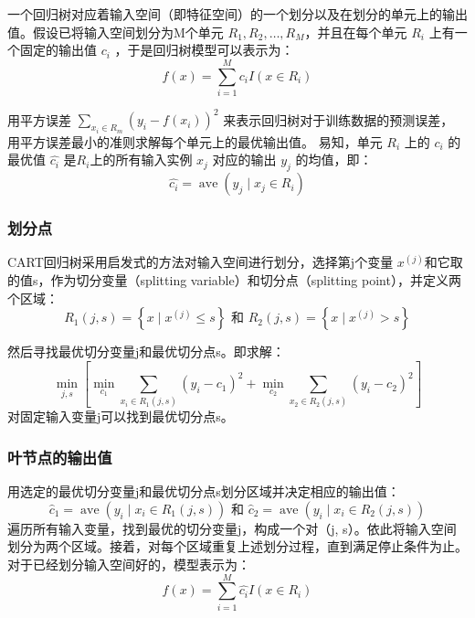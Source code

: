 \documentclass[UTF8,a4paper,AutoFakeBold,AutoFakeSlant]{article}
\begin{document}
一个回归树对应着输入空间（即特征空间）的一个划分以及在划分的单元上的输出值。假设已将输入空间划分为M个单元 
$ R_1, R_2,\dots, R_M $，并且在每个单元 $R_i$ 上有一个固定的输出值 $c_i$ ，于是回归树模型可以表示为：
\begin{equation*}
  f(x)=\sum_{i=1}^{M} c_{i} I\left(x \in R_{i}\right)
\end{equation*}

用平方误差 $\sum_{x_{i} \in R_{m}}\left(y_{i}-f\left(x_{i}\right)\right)^{2}$ 来表示回归树对于训练数据的预测误差，
用平方误差最小的准则求解每个单元上的最优输出值。
易知，单元 $R_i$ 上的 $c_i$ 的最优值 $\hat{c_i}$ 是$R_i$上的所有输入实例 $x_j$ 对应的输出 $y_j$ 的均值，即：
\begin{equation*}
  \hat{c_{i}}=\operatorname{ave}\left(y_{j} \mid x_{j} \in R_{i}\right)
\end{equation*}


\subsubsection{划分点}
CART回归树采用启发式的方法对输入空间进行划分，选择第j个变量
$x^{(j)}$和它取的值s，作为切分变量（splitting variable）和切分点（splitting point），并定义两个区域：
\begin{equation*}
  R_{1}(j, s)=\left\{x \mid x^{(j)} \leq s\right\} \text { 和 } R_{2}(j, s)=\left\{x \mid x^{(j)}>s\right\}
\end{equation*}

然后寻找最优切分变量j和最优切分点s。即求解：
\begin{equation*}
  \min _{j, s}\left[\min _{c_{1}} \sum_{x_{i} \in R_{1}(j, s)}\left(y_{i}-c_{1}\right)^{2}+\min _{c_{2}} \sum_{x_{2} \in R_{2}(j, s)}\left(y_{i}-c_{2}\right)^{2}\right]
\end{equation*}
对固定输入变量j可以找到最优切分点s。


\subsubsection{叶节点的输出值}
用选定的最优切分变量j和最优切分点s划分区域并决定相应的输出值：
\begin{equation*}
  \hat{c}_{1}=\operatorname{ave}\left(y_{i} \mid x_{i} \in R_{1}(j, s)\right) \text { 和 } \hat{c}_{2}=\operatorname{ave}\left(y_{i} \mid x_{i} \in R_{2}(j, s)\right)
\end{equation*}
遍历所有输入变量，找到最优的切分变量j，构成一个对（j, s）。依此将输入空间划分为两个区域。接着，对每个区域重复上述划分过程，直到满足停止条件为止。
对于已经划分输入空间好的，模型表示为：
\begin{equation*}
  f(x)=\sum_{i=1}^{M} \hat{c_{i}} I\left(x \in R_{i}\right)
\end{equation*}
\end{document}

